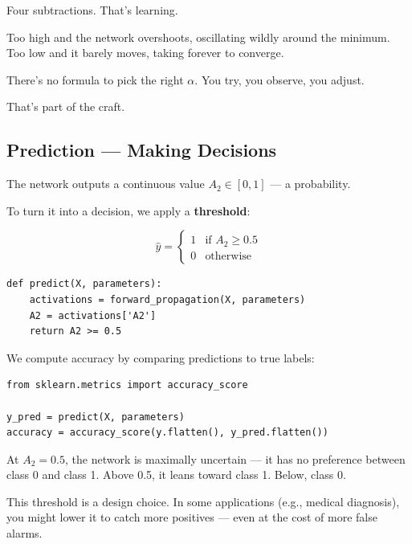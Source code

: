 \documentclass[11pt]{article}
\begin{document}
Four subtractions. That's learning.

\begin{warnbox}[title=The Learning Rate]
Too high and the network overshoots, oscillating wildly around the minimum.
Too low and it barely moves, taking forever to converge.

There's no formula to pick the right $\alpha$. You try, you observe, you adjust.

That's part of the craft.
\end{warnbox}

\subsection{Prediction --- Making Decisions}

The network outputs a continuous value $A_2 \in [0, 1]$ --- a probability.

To turn it into a decision, we apply a \textbf{threshold}:

\[
\hat{y} = \begin{cases} 1 & \text{if } A_2 \geq 0.5 \\ 0 & \text{otherwise} \end{cases}
\]

\begin{lstlisting}
def predict(X, parameters):
    activations = forward_propagation(X, parameters)
    A2 = activations['A2']
    return A2 >= 0.5
\end{lstlisting}

We compute accuracy by comparing predictions to true labels:

\begin{lstlisting}
from sklearn.metrics import accuracy_score

y_pred = predict(X, parameters)
accuracy = accuracy_score(y.flatten(), y_pred.flatten())
\end{lstlisting}

\begin{insightbox}[title=Why 0.5?]
At $A_2 = 0.5$, the network is maximally uncertain --- it has no preference between class 0 and class 1.
Above 0.5, it leans toward class 1. Below, class 0.

This threshold is a design choice. In some applications (e.g., medical diagnosis), you might lower it to catch more positives --- even at the cost of more false alarms.
\end{insightbox}
\end{document}
